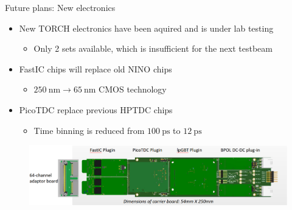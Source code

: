 \documentclass[xcolor={dvipsnames}]{beamer}
\begin{document}
\begin{frame}{Future plans: New electronics}
  \begin{itemize}
    \setlength\itemsep{1.0em}
    \item{New TORCH electronics have been aquired and is under lab testing}
    \begin{itemize}
      \item{Only 2 sets available, which is insufficient for the next testbeam}
    \end{itemize}
    \item{FastIC chips will replace old NINO chips}
    \begin{itemize}
      \item{$\SI{250}{\nano\meter}\to\SI{65}{\nano\meter}$ CMOS technology}
    \end{itemize}
    \item{PicoTDC replace previous HPTDC chips}
    \begin{itemize}
      \item{Time binning is reduced from $\SI{100}{\pico\second}$ to $\SI{12}{\pico\second}$}
    \end{itemize}
  \end{itemize}
  \begin{figure}
    \centering
    \includegraphics[width = 1.0\textwidth]{Figs/NewTORCHElectronics.png}
  \end{figure}
\end{frame}
\end{document}
